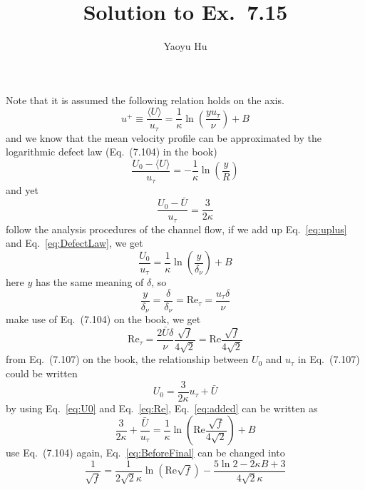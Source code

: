 \documentclass{article}
\title{Solution to Ex.~7.15}
\author{Yaoyu Hu}
\newcommand{\enangle}[1]{\langle {#1} \rangle}
\newcommand{\eqrefnew}[1]{Eq.~\eqref{#1}}
\begin{document}
\maketitle
Note that it is assumed the following relation holds on the axis.
\begin{equation} \label{eq:uplus}
	u^+ \equiv \frac{\enangle{U}}{u_{\tau}} = \frac{1}{\kappa}\ln\left( \frac{yu_{\tau}}{\nu} \right) + B
\end{equation}
and we know that the mean velocity profile can be approximated by the logarithmic defect law (Eq.~(7.104) in the book)
\begin{equation} \label{eq:DefectLaw}
	\frac{U_0 - \enangle{U}}{u_{\tau}} = -\frac{1}{\kappa}\ln\left( \frac{y}{R} \right)
\end{equation}
and yet
\begin{equation}
	\frac{U_0 - \bar{U}}{u_{\tau}} = \frac{3}{2\kappa}
\end{equation}
follow the analysis procedures of the channel flow, if we add up \eqrefnew{eq:uplus} and \eqrefnew{eq:DefectLaw}, we get
\begin{equation} \label{eq:added}
	\frac{U_0}{u_{\tau}} = \frac{1}{\kappa}\ln\left( \frac{y}{\delta_{\nu}} \right) + B
\end{equation}
here $y$ has the same meaning of $\delta$, so
\begin{equation}
	\frac{y}{\delta_{\nu}} = \frac{\delta}{\delta_{\nu}} = \text{Re}_{\tau} = \frac{u_{\tau} \delta}{\nu}
\end{equation}
make use of Eq.~(7.104) on the book, we get
\begin{equation} \label{eq:Re}
	\text{Re}_{\tau} = \frac{2\bar{U}\delta}{\nu} \frac{\sqrt{f}}{4\sqrt{2}} = \text{Re}\frac{\sqrt{f}}{4\sqrt{2}}
\end{equation}
from Eq.~(7.107) on the book, the relationship between $U_0$ and $u_{\tau}$ in Eq.~(7.107) could be written
\begin{equation} \label{eq:U0}
	U_0 = \frac{3}{2\kappa}u_{\tau} + \bar{U}
\end{equation}
by using \eqrefnew{eq:U0} and \eqrefnew{eq:Re}, \eqrefnew{eq:added} can be written as
\begin{equation} \label{eq:BeforeFinal}
	\frac{3}{2\kappa} + \frac{\bar{U}}{u_{\tau}} = \frac{1}{\kappa}\ln\left( \text{Re} \frac{\sqrt{f}}{4\sqrt{2}} \right) + B
\end{equation}
use Eq.~(7.104) again, \eqrefnew{eq:BeforeFinal} can be changed into
\begin{equation}
	\frac{1}{\sqrt{f}} = \frac{1}{2\sqrt{2}\kappa}\ln\left( \text{Re}\sqrt{f} \right) - \frac{5\ln 2 - 2\kappa B + 3}{4\sqrt{2}\kappa}
\end{equation}
\end{document}
